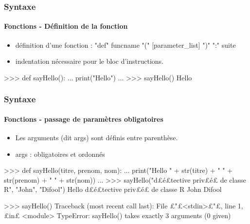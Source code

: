 \begin{frame}[fragile]
\frametitle{Syntaxe}
\framesubtitle{Fonctions - Définition de la fonction}
\begin{itemize}
\item définition d'une fonction : "def" funcname "(" [parameter\_list] ")" ":" suite
\item indentation nécessaire pour le bloc d'instructions. 
\end{itemize}
\begin{pythonConsole}
>>> def sayHello(): 
...    print("Hello")
...
>>> sayHello()
Hello
\end{pythonConsole}
\end{frame}
\begin{frame}[fragile]
\frametitle{Syntaxe}
\framesubtitle{Fonctions - passage de paramètres obligatoires}
\begin{itemize}
\item Les arguments (dit args) sont définis entre parenthèse. 
\item args : obligatoires et ordonnés
\end{itemize}
\begin{pythonConsole}
>>> def sayHello(titre, prenom, nom): 
...    print("Hello " + str(titre) + " " + str(prenom) + " " + str(nom))
...
>>> sayHello("d£{\color{magenta}é}£tective priv£{\color{magenta}é}£ de classe R", "John", "Difool")
Hello d£é£tective priv£é£ de classe R John Difool
\end{pythonConsole}
\begin{pythonConsole}
>>> sayHello()
Traceback (most recent call last):
  File £"£<stdin>£"£, line 1, £in£ <module>
TypeError: sayHello() takes exactly 3 arguments (0 given)
\end{pythonConsole}
\end{frame}
